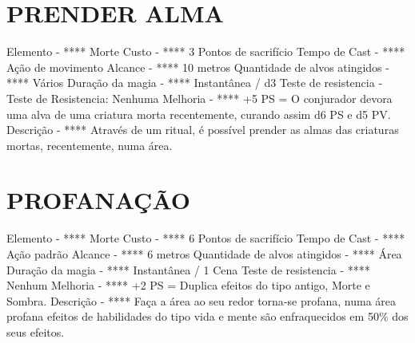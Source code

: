 \documentclass{article}%
\begin{document}
\section{PRENDER ALMA}%
\label{sec:PRENDERALMA}%
Elemento {-} **** Morte\newline%
Custo {-} **** 3 Pontos de sacrifício\newline%
Tempo de Cast {-} **** Ação de movimento\newline%
Alcance {-} **** 10 metros\newline%
Quantidade de alvos atingidos {-} **** Vários\newline%
Duração da magia {-} **** Instantânea / d3\newline%
Teste de resistencia {-} Teste de Resistencia: Nenhuma\newline%
Melhoria {-} **** +5 PS = O conjurador devora uma alva de uma criatura morta recentemente, curando assim d6 PS e d5 PV.\newline%
Descrição {-} **** Através de um ritual, é possível prender as almas das criaturas mortas, recentemente, numa área.\newline%

%
\section{PROFANAÇÃO}%
\label{sec:PROFANAO}%
Elemento {-} **** Morte\newline%
Custo {-} **** 6 Pontos de sacrifício\newline%
Tempo de Cast {-} **** Ação padrão\newline%
Alcance {-} **** 6 metros\newline%
Quantidade de alvos atingidos {-} **** Área\newline%
Duração da magia {-} **** Instantânea / 1 Cena\newline%
Teste de resistencia {-} **** Nenhum\newline%
Melhoria {-} **** +2 PS = Duplica efeitos do tipo antigo, Morte e Sombra.\newline%
Descrição {-} **** Faça a área ao seu redor torna{-}se profana, numa área profana efeitos de habilidades do tipo vida e mente são enfraquecidos em 50\% dos seus efeitos.\newline%

%
\end{document}
